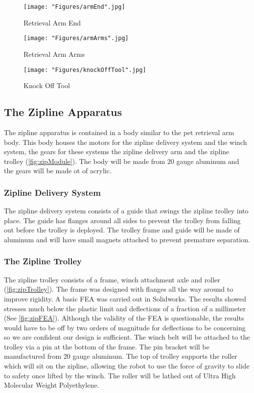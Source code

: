 \documentclass[11pt, oneside]{article} %
\begin{document}
	\begin{figure}[h]
		\centering
		\begin{minipage}[t]{.5\textwidth}
			\centering
			\texttt{[image: "Figures/armEnd".jpg]}
			\caption[Retrieval Arm End]{Retrieval Arm End}
			\label{fig:armEnd}
		\end{minipage}%
		\begin{minipage}[t]{.5\textwidth}
			\centering
			\texttt{[image: "Figures/armArms".jpg]}
			\caption[Retrieval Arm Arms]{Retrieval Arm Arms}
			\label{fig:arm}
		\end{minipage}
	\end{figure}
	
	\begin{figure}[!h]
		\centering
		\texttt{[image: "Figures/knockOffTool".jpg]}
		\caption[Knock Off Tool]{Knock Off Tool}
		\label{fig:knockOffTool}
	\end{figure}
	
	\newpage
	\subsection{The Zipline Apparatus}
	The zipline apparatus is contained in a body similar to the pet retrieval arm body. This body houses the motors for the zipline delivery system and the winch system, the gears for these systems the zipline delivery arm and the zipline trolley (\autoref{fig:zipModule}). The body will be made from 20 gauge aluminum and the gears will be made ot of acrylic.
	
		\subsubsection{Zipline Delivery System}
		The zipline delivery system consists of a guide that swings the zipline trolley into place. The guide has flanges around all sides to prevent the trolley from falling out before the trolley is deployed. The trolley frame and guide will be made of aluminum and will have small magnets attached to prevent premature separation.
		
		\subsubsection{The Zipline Trolley}
		The zipline trolley consists of a frame, winch attachment axle and roller (\autoref{fig:zipTrolley}). The frame was designed with flanges all the way around to improve rigidity. A basic FEA was carried out in Solidworks. The results showed stresses much below the plastic limit and deflections of a fraction of a millimeter (See \autoref{fig:zipFEA}). Although the validity of the FEA is questionable, the results would have to be off by two orders of magnitude for deflections to be concerning so we are confident our design is sufficient. The winch belt will be attached to the trolley via a pin at the bottom of the frame. The pin bracket will be manufactured from 20 gauge aluminum. The top of trolley supports the roller which will sit on the zipline, allowing the robot to use the force of gravity to slide to safety once lifted by the winch. The roller will be lathed out of Ultra High Molecular Weight Polyethylene.
		
\end{document}

